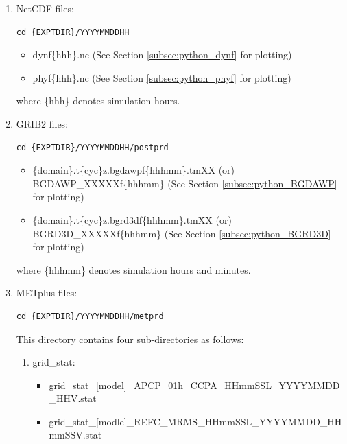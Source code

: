 \documentclass[11pt,fleqn]{report}              %
\begin{document}
\begin{enumerate}
\item NetCDF files:

\lstset{language=bash}   
\begin{lstlisting}[frame=trBL]
cd {EXPTDIR}/YYYYMMDDHH
\end{lstlisting}

\begin{itemize}
\item dynf\{hhh\}.nc (See Section \ref{subsec:python_dynf} for plotting)
\item phyf\{hhh\}.nc (See Section \ref{subsec:python_phyf} for plotting)
\end{itemize}
where \{hhh\} denotes simulation hours. \\

\item GRIB2 files:

\lstset{language=bash}   
\begin{lstlisting}[frame=trBL]
cd {EXPTDIR}/YYYYMMDDHH/postprd
\end{lstlisting}

\begin{itemize}
\item \{domain\}.t\{cyc\}z.bgdawpf\{hhhmm\}.tmXX (or) BGDAWP\_XXXXXf\{hhhmm\} (See Section \ref{subsec:python_BGDAWP} for plotting)
\item \{domain\}.t\{cyc\}z.bgrd3df\{hhhmm\}.tmXX (or) BGRD3D\_XXXXXf\{hhhmm\} (See Section \ref{subsec:python_BGRD3D} for plotting)
\end{itemize}
where \{hhhmm\} denotes simulation hours and minutes. \\

\item METplus files:

\lstset{language=bash}   
\begin{lstlisting}[frame=trBL]
cd {EXPTDIR}/YYYYMMDDHH/metprd
\end{lstlisting}

This directory contains four sub-directories as follows:
\begin{enumerate}
\item grid\_stat:
\begin{itemize}
\item grid\_stat\_[model]\_APCP\_01h\_CCPA\_HHmmSSL\_YYYYMMDD\_HHV.stat
\item grid\_stat\_[modle]\_REFC\_MRMS\_HHmmSSL\_YYYYMMDD\_HHmmSSV.stat
\end{itemize}


\end{enumerate}
\end{enumerate}
\end{document}
